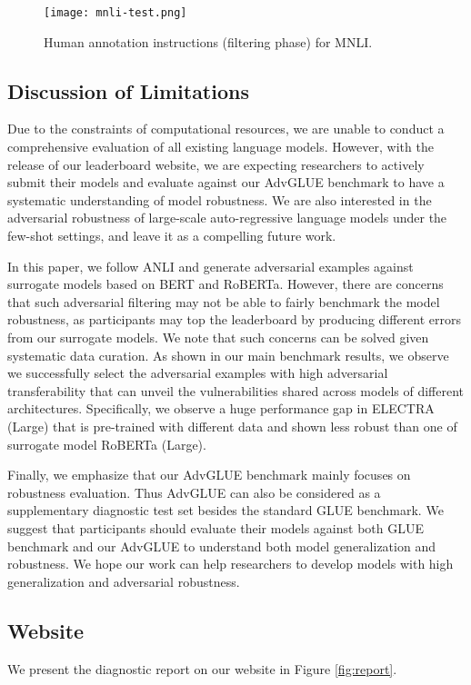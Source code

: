 \documentclass{article}
\newcommand{\method}{AdvGLUE\xspace}
\begin{document}
\begin{figure}
    \centering
    \texttt{[image: mnli-test.png]}
    \caption{Human annotation instructions (filtering phase) for MNLI.}
    \label{fig:testing}
\end{figure}

\subsection{Discussion of Limitations}
\label{appendix:limit}

Due to the constraints of computational resources, we are unable to conduct a comprehensive evaluation of all existing  language models. However, with the release of our leaderboard website, we are expecting researchers to actively submit their models and evaluate against our \method benchmark to have a systematic understanding of model robustness. We are also interested in the adversarial robustness of large-scale auto-regressive language models under the few-shot settings, and leave it as a compelling future work.

In this paper, we follow ANLI \citep{anli} and generate adversarial examples against surrogate models based on BERT and RoBERTa. However, there are concerns \citep{criteria} that such adversarial filtering may not be able to fairly benchmark the model robustness, as participants may top the leaderboard by producing different errors from our surrogate models. We note that such concerns can be solved given systematic data curation. As shown in our main benchmark results, we observe we successfully select the adversarial examples with high adversarial transferability that can unveil the vulnerabilities shared across models of different architectures. Specifically, we observe a huge performance gap in ELECTRA (Large) that is pre-trained with different data and shown less robust than one of surrogate model RoBERTa (Large).

Finally, we emphasize that our \method benchmark mainly focuses on robustness evaluation. Thus \method can  also be considered as a supplementary diagnostic test set besides the standard GLUE benchmark.  We suggest that participants should evaluate their models against both GLUE benchmark and our \method to understand both model generalization and robustness. We hope our work can help researchers to develop models with high generalization and adversarial robustness.


\subsection{Website}
\label{appendix:website}
We present the diagnostic report on our website in Figure \ref{fig:report}.
\end{document}
